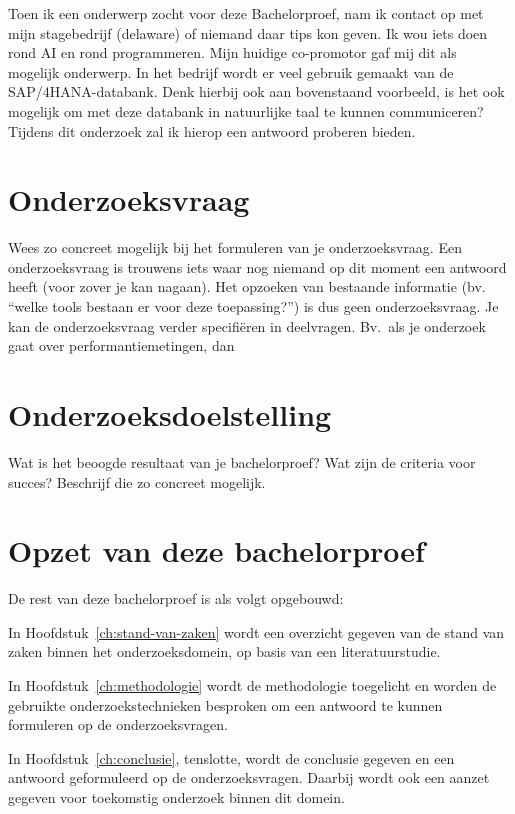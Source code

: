 Toen ik een onderwerp zocht voor deze Bachelorproef, nam ik contact op met mijn stagebedrijf (delaware) of niemand daar tips kon geven. Ik wou iets doen rond AI en rond programmeren. Mijn huidige co-promotor gaf mij dit als mogelijk onderwerp. In het bedrijf wordt er veel gebruik gemaakt van de SAP/4HANA-databank. Denk hierbij ook aan bovenstaand voorbeeld, is het ook mogelijk om met deze databank in natuurlijke taal te kunnen communiceren? Tijdens dit onderzoek zal ik hierop een antwoord proberen bieden.

\section{Onderzoeksvraag}
\label{sec:onderzoeksvraag}

Wees zo concreet mogelijk bij het formuleren van je onderzoeksvraag. Een onderzoeksvraag is trouwens iets waar nog niemand op dit moment een antwoord heeft (voor zover je kan nagaan). Het opzoeken van bestaande informatie (bv. ``welke tools bestaan er voor deze toepassing?'') is dus geen onderzoeksvraag. Je kan de onderzoeksvraag verder specifiëren in deelvragen. Bv.~als je onderzoek gaat over performantiemetingen, dan 

\section{Onderzoeksdoelstelling}
\label{sec:onderzoeksdoelstelling}

Wat is het beoogde resultaat van je bachelorproef? Wat zijn de criteria voor succes? Beschrijf die zo concreet mogelijk.

\section{Opzet van deze bachelorproef}
\label{sec:opzet-bachelorproef}


De rest van deze bachelorproef is als volgt opgebouwd:

In Hoofdstuk~\ref{ch:stand-van-zaken} wordt een overzicht gegeven van de stand van zaken binnen het onderzoeksdomein, op basis van een literatuurstudie.

In Hoofdstuk~\ref{ch:methodologie} wordt de methodologie toegelicht en worden de gebruikte onderzoekstechnieken besproken om een antwoord te kunnen formuleren op de onderzoeksvragen.


In Hoofdstuk~\ref{ch:conclusie}, tenslotte, wordt de conclusie gegeven en een antwoord geformuleerd op de onderzoeksvragen. Daarbij wordt ook een aanzet gegeven voor toekomstig onderzoek binnen dit domein.

